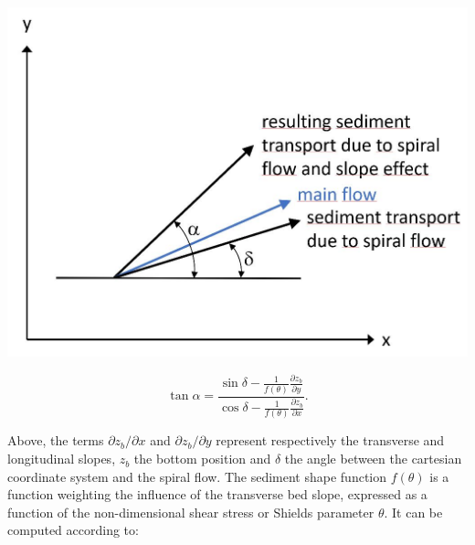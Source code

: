 \begin{minipage}{0.5\textwidth}
\centering
\includegraphics[scale=0.5]{./graphics/sketch_direction_sediment.jpg}%
\end{minipage}
\begin{minipage}{0.5\textwidth}
\begin{equation}
\displaystyle
\tan\alpha = \frac{\sin\delta-\frac{1}{f(\theta)}\frac{\partial z_b}{\partial y}}{\cos\delta-\frac{1}{f(\theta)}\frac{\partial z_b}{\partial x}}.
\end{equation}
\end{minipage}


Above, the terms $\partial z_b/\partial x$ and $\partial z_b/\partial y$ represent respectively the transverse and longitudinal slopes, $z_b$ the bottom position and $\delta$ the angle
between the cartesian coordinate system and the spiral flow. The sediment shape function $f(\theta)$ is a function weighting the influence of the transverse bed slope, expressed as a function of the non-dimensional shear stress or Shields parameter $\theta$. It can be computed according to:

